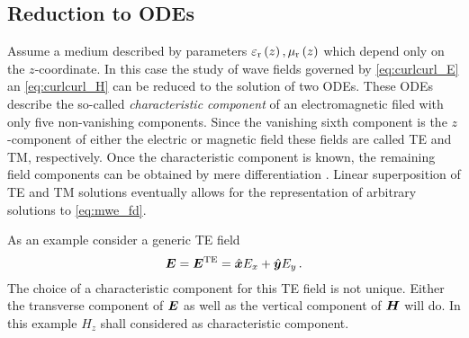 		
		

\subsection{Reduction to \aclp{ODE}}
\label{subsec:5_comp_filds}

Assume a medium described by parameters $\varepsilon_{\mathrm{r}}\left(z\right), \mu_{\mathrm{r}}\left(z\right)$ which depend only on the $z$-coordinate. In this case the study of wave fields governed by \eqref{eq:curlcurl_E} an \eqref{eq:curlcurl_H} can be reduced to the solution of two \acsp{ODE}. These \acsp{ODE} describe the so-called \emph{characteristic component} of an electromagnetic filed with only five non-vanishing components. Since the vanishing sixth component is the $z$-component of either the electric or magnetic field these fields are called \ac{TE} and \ac{TM}, respectively. Once the characteristic component is known, the remaining field components can be obtained by mere differentiation \cite[pp.~75]{Chew1999}. Linear superposition of \ac{TE} and \ac{TM} solutions eventually allows for the representation of arbitrary solutions to \eqref{eq:mwe_fd}.

As an example consider a generic \ac{TE} field
\begin{equation}\label{eq:TE_E_field_components}
	\pvec{E} = \pvec{E}^\te = \uv{x}E_x + \uv{y}E_y \,.
\end{equation}
The choice of a characteristic component for this \ac{TE} field is not unique. Either the transverse component of $\pvec{E}$ as well as the vertical component of $\pvec{H}$ will do. In this example $H_z$ shall considered as characteristic component.

